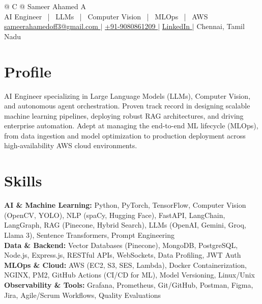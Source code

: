 \documentclass[a4paper,10pt]{article}
\begin{document}
\pagestyle{empty} 

\begin{tabularx}{\linewidth}{@{} C @{}}
\color[HTML]{1C033C} \Huge{Sameer Ahamed A} \\[6pt]
AI Engineer ~|~ LLMs ~|~ Computer Vision ~|~ MLOps ~|~ AWS \\

\href{mailto:sameerahamedoff3@gmail.com}{\textcolor[HTML]{371e77}{{\faEnvelope} sameerahamedoff3@gmail.com }} $|$
\href{tel:+919080861209}{\textcolor[HTML]{371e77}{{\faMobile} +91-9080861209 }} $|$
\href{https://www.linkedin.com/in/sameer-ahamed-338558310/}{\textcolor[HTML]{371e77}{{{\raisebox{-0.05\height}{\faLinkedin} LinkedIn }}}} $|$
\textcolor[HTML]{371e77}{Chennai, Tamil Nadu}
\end{tabularx}

\section{Profile}
AI Engineer specializing in Large Language Models (LLMs), Computer Vision, and autonomous agent orchestration. Proven track record in designing scalable machine learning pipelines, deploying robust RAG architectures, and driving enterprise automation. Adept at managing the end-to-end ML lifecycle (MLOps), from data ingestion and model optimization to production deployment across high-availability AWS cloud environments.

\section{Skills}
\noindent
\color[HTML]{1C033C}\textbf{AI \& Machine Learning:} Python, PyTorch, TensorFlow, Computer Vision (OpenCV, YOLO), NLP (spaCy, Hugging Face), FastAPI, LangChain, LangGraph, RAG (Pinecone, Hybrid Search), LLMs (OpenAI, Gemini, Groq, Llama 3), Sentence Transformers, Prompt Engineering \\
\color[HTML]{1C033C}\textbf{Data \& Backend:} Vector Databases (Pinecone), MongoDB, PostgreSQL, Node.js, Express.js, RESTful APIs, WebSockets, Data Profiling, JWT Auth \\
\color[HTML]{1C033C}\textbf{MLOps \& Cloud:} AWS (EC2, S3, SES, Lambda), Docker Containerization, NGINX, PM2, GitHub Actions (CI/CD for ML), Model Versioning, Linux/Unix \\
\color[HTML]{1C033C}\textbf{Observability \& Tools:} Grafana, Prometheus, Git/GitHub, Postman, Figma, Jira, Agile/Scrum Workflows, Quality Evaluations
\end{document}
